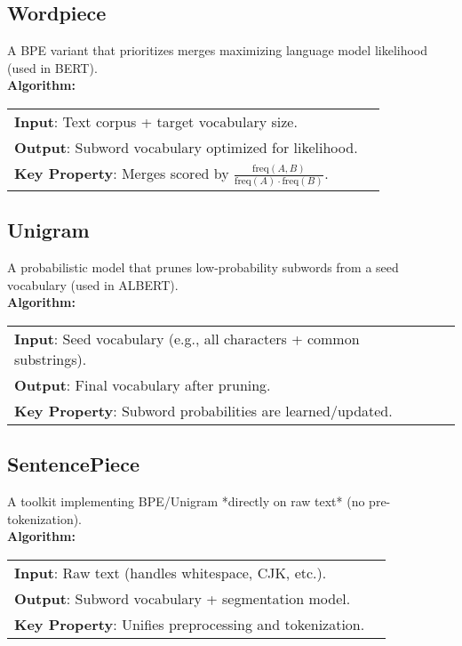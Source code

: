 \subsection{Wordpiece}\label{Section2.2.3}
    A BPE variant that prioritizes merges maximizing language model likelihood (used in BERT). \\
    \textbf{Algorithm:} \\
    \begin{tabular}{ll}  
        \textbf{Input}: Text corpus + target vocabulary size.  \\
        \textbf{Output}: Subword vocabulary optimized for likelihood.  \\
        \textbf{Key Property}: Merges scored by $\frac{\text{freq}(A,B)}{\text{freq}(A) \cdot \text{freq}(B)}$.  \\
    \end{tabular}   

\subsection{Unigram}\label{Section2.2.4}
    A probabilistic model that prunes low-probability subwords from a seed vocabulary (used in ALBERT). \\
    \textbf{Algorithm:} \\
    \begin{tabular}{ll}  
        \textbf{Input}: Seed vocabulary (e.g., all characters + common substrings).  \\
        \textbf{Output}: Final vocabulary after pruning.  \\
        \textbf{Key Property}: Subword probabilities are learned/updated.  \\
    \end{tabular}   

\subsection{SentencePiece}\label{Section2.2.5}
    A toolkit implementing BPE/Unigram *directly on raw text* (no pre-tokenization). \\
    \textbf{Algorithm:} \\
    \begin{tabular}{ll}  
        \textbf{Input}: Raw text (handles whitespace, CJK, etc.).  \\
        \textbf{Output}: Subword vocabulary + segmentation model.  \\
        \textbf{Key Property}: Unifies preprocessing and tokenization.  \\
    \end{tabular}  